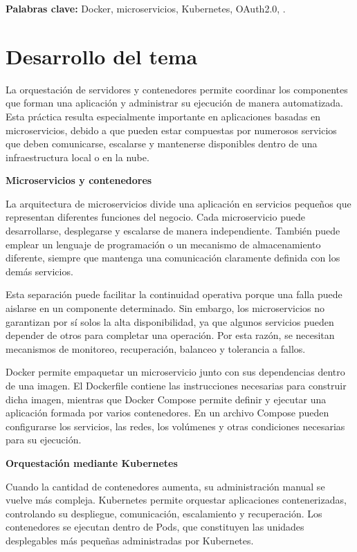 \documentclass[12pt]{article}
\begin{document}
	\noindent
	\textbf{Palabras clave:} Docker, microservicios, Kubernetes, OAuth2.0, .
	
	
	\section*{Desarrollo del tema}
	
	La orquestación de servidores y contenedores permite coordinar los
	componentes que forman una aplicación y administrar su ejecución de manera
	automatizada. Esta práctica resulta especialmente importante en aplicaciones
	basadas en microservicios, debido a que pueden estar compuestas por numerosos
	servicios que deben comunicarse, escalarse y mantenerse disponibles dentro de
	una infraestructura local o en la nube.
	
	\noindent\textbf{Microservicios y contenedores}
	
	La arquitectura de microservicios divide una aplicación en servicios pequeños
	que representan diferentes funciones del negocio. Cada microservicio puede
	desarrollarse, desplegarse y escalarse de manera independiente. También puede
	emplear un lenguaje de programación o un mecanismo de almacenamiento diferente,
	siempre que mantenga una comunicación claramente definida con los demás
	servicios.
	
	Esta separación puede facilitar la continuidad operativa porque una falla puede
	aislarse en un componente determinado. Sin embargo, los microservicios no
	garantizan por sí solos la alta disponibilidad, ya que algunos servicios pueden
	depender de otros para completar una operación. Por esta razón, se necesitan
	mecanismos de monitoreo, recuperación, balanceo y tolerancia a fallos.
	
	Docker permite empaquetar un microservicio junto con sus dependencias dentro de
	una imagen. El Dockerfile contiene las instrucciones necesarias para construir
	dicha imagen, mientras que Docker Compose permite definir y ejecutar una
	aplicación formada por varios contenedores. En un archivo Compose pueden
	configurarse los servicios, las redes, los volúmenes y otras condiciones
	necesarias para su ejecución.
	
	\noindent\textbf{Orquestación mediante Kubernetes}
	
	Cuando la cantidad de contenedores aumenta, su administración manual se vuelve
	más compleja. Kubernetes permite orquestar aplicaciones contenerizadas,
	controlando su despliegue, comunicación, escalamiento y recuperación. Los
	contenedores se ejecutan dentro de Pods, que constituyen las unidades
	desplegables más pequeñas administradas por Kubernetes.
	
\end{document}
